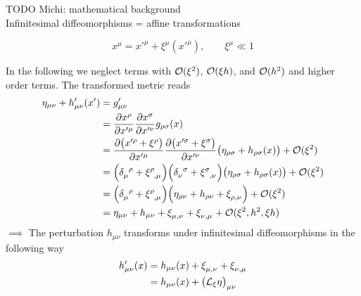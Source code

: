 TODO Michi: mathematical background \\%
Infinitesimal diffeomorphisms = affine transformations
\begin{definition}
    \begin{equation}
        x^\mu = x'^\mu + \xi^\mu(x'^\mu), \qquad \xi^\mu \ll 1
    \end{equation}
\end{definition}
In the following we neglect terms with $\mathcal{O}(\xi^2)$, $\mathcal{O}(\xi h)$, and $\mathcal{O}(h^2)$ and higher order terms.
The transformed metric reads
\begin{equation}
    \begin{split}
        \eta_{\mu\nu} + h'_{\mu\nu}(x') &= g'_{\mu\nu} \\
        &= \frac{\partial x^\rho}{\partial x'^\mu} \frac{\partial x^\sigma}{\partial x'^\nu} g_{\rho\sigma}(x) \\
        &= \frac{\partial \left( x'^\rho + \xi^\rho \right)}{\partial x'^\mu}
        \frac{\partial \left( x'^\sigma + \xi^\sigma \right)}{\partial x'^\nu}
        \left( \eta_{\rho\sigma} + h_{\rho\sigma}(x) \right) + \landauO(\xi^2) \\
        &= \left( \tensor{\delta}{_\mu^\rho} + \tensor{\xi}{^\rho_,_\mu} \right)
        \left( \tensor{\delta}{_\nu^\sigma} + \tensor{\xi}{^\sigma_,_\nu} \right)
        \left( \eta_{\rho\sigma} + h_{\rho\sigma}(x) \right) + \landauO(\xi^2) \\
        &= \left( \tensor{\delta}{_\mu^\rho} + \tensor{\xi}{^\rho_,_\mu} \right)
        \left( \eta_{\rho\nu} + h_{\rho\nu} + \tensor{\xi}{_\rho_,_\nu} \right) + \landauO(\xi^2)  \\
        &= \eta_{\mu\nu} + h_{\mu\nu} + \tensor{\xi}{_\mu_,_\nu} + \tensor{\xi}{_\nu_,_\mu} + \landauO(\xi^2,h^2,\xi h)
    \end{split}
\end{equation}
$\implies$ The perturbation $h_{\mu\nu}$ transforms under infinitesimal diffeomorphisms in the following way
\begin{equation}
    \begin{split}
        h'_{\mu\nu}(x) &= h_{\mu\nu}(x) + \tensor{\xi}{_\mu_,_\nu} + \tensor{\xi}{_\nu_,_\mu} \\
        &= h_{\mu\nu}(x) + \left(\liedif{\xi}{\eta} \right)_{\mu\nu}
    \end{split}
\end{equation}
